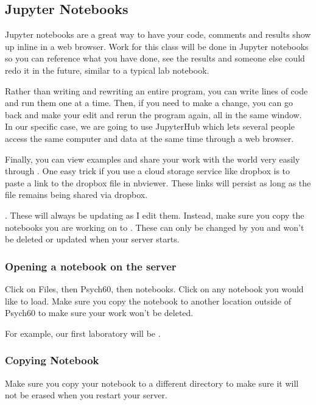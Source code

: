 \documentclass[letterpaper,10pt,english]{sphinxmanual}
\begin{document}
\subsection{Jupyter Notebooks}
\label{\detokenize{content/Introduction_to_JupyterHub:jupyter-notebooks}}
Jupyter notebooks are a great way to have your code, comments and results show up inline in a web browser. Work for this class will be done in Jupyter notebooks so you can reference what you have done, see the results and someone else could redo it in the future, similar to a typical lab notebook.

Rather than writing and re\sphinxhyphen{}writing an entire program, you can write lines of code and run them one at a time. Then, if you need to make a change, you can go back and make your edit and rerun the program again, all in the same window. In our specific case, we are going to use JupyterHub which lets several people access the same computer and data at the same time through a web browser.

Finally, you can view examples and share your work with the world very easily through .  One easy trick if you use a cloud storage service like dropbox is to paste a link to the dropbox file in nbviewer.  These links will persist as long as the file remains being shared via dropbox.

. These will always be updating as I edit them. Instead, make sure you copy the notebooks you are working on to . These can only be changed by you and won’t be deleted or updated when your server starts.


\subsubsection{Opening a notebook on the server}
\label{\detokenize{content/Introduction_to_JupyterHub:opening-a-notebook-on-the-server}}
Click on Files, then Psych60, then notebooks. Click on any notebook you would like to load. Make sure you copy the notebook to another location outside of Psych60 to make sure your work won’t be deleted.

For example, our first laboratory will be .


\subsubsection{Copying Notebook}
\label{\detokenize{content/Introduction_to_JupyterHub:copying-notebook}}
Make sure you copy your notebook to a different directory to make sure it will not be erased when you restart your server.
\end{document}
